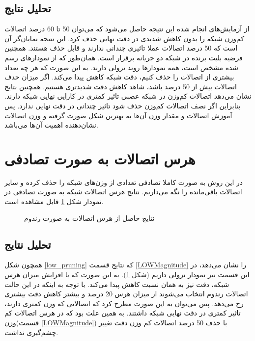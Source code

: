 \subsection{تحلیل نتایج}
از آزمایش‌های انجام شده این نتیجه حاصل می‌شود که می‌توان 50 تا 60 درصد اتصالات کم‌وزن شبکه 
را بدون کاهش شدیدی در دقت نهایی حذف کرد. این نتیجه نمایان‌گر آن است که 50 درصد اتصالات عملا تاثیری چندانی ندارند و قابل حذف هستند. همچنین فرضیه بلیت برنده در شبکه دو جریانه
برقرار است.
همان‌طور که از نمودار‌های رسم شده مشخص است، همه نمودار‌ها روند نزولی دارند. به این صورت که هر چه تعداد بیشتری از اتصالات را حذف کنیم، دقت شبکه کاهش پیدا می‌کند. اگر میزان حدف اتصالات بیش از 50 درصد باشد، شاهد کاهش دقت شدیدتری هستیم.
\newline
همچنین نتایج نشان می‌دهد اتصالات کم‌وزن در شبکه عصبی تاثیر کمتری در کارایی نهایی شبکه دارند. بنابراین اگر نصف اتصالات کم‌وزن حذف شود تاثیر چندانی در دقت نهایی ندارد. پس آموزش اتصالات و مقدار وزن آن‌ها به بهترین شکل صورت گرفته و وزن اتصالات نشان‌دهنده اهمیت آن‌ها می‌باشد.

\section{هرس اتصالات به صورت تصادفی}

	در این روش به صورت کاملا تصادفی تعدادی از وزن‌های شبکه را حذف کرده و سایر اتصالات باقی‌مانده را نگه می‌داریم. نتایج هرس اتصالات شبکه
	به صورت تصادفی در نمودار شکل \ref{random_pruning} قابل مشاهده است.
	
	
\begin{figure}[H]		  		    
	\caption{نتایج حاصل از هرس اتصالات به صورت رندوم}
	\label{random_pruning}
\end{figure}
\subsection{تحلیل نتایج}	
همچون شکل \ref{low_pruning} که نتایج قسمت \ref{LOWMagnitude} را نشان می‌دهد، در این قسمت نیز نمودار نزولی داریم (شکل \ref{random_pruning}). به این صورت که با افزایش میزان هرس شبکه، دقت نیز به همان نسبت کاهش پیدا می‌کند. با توجه به اینکه در این حالت اتصالات رندوم انتخاب می‌شوند از میزان هرس 20 درصد و بیشتر کاهش دقت بیشتری رخ می‌دهد. پس می‌توان به این صورت مطرح کرد که اتصالاتی که وزن کمتری دارند، تاثیر کمتری در دقت نهایی شبکه داشتند. به همین علت بود که در هرس اتصالات کم وزن(قسمت \ref{LOWMagnitude}) با حذف 50 درصد اتصالات کم وزن دقت تغییر چشم‌گیری نداشت.


